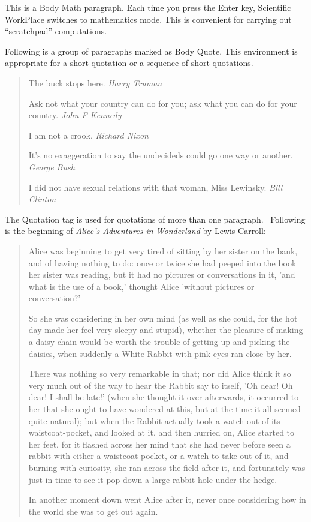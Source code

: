 \documentclass[11pt,spanish]{report}
\begin{document}
This is a Body Math paragraph. Each time you press the Enter key, Scientific
WorkPlace switches to mathematics mode. This is convenient for carrying out
``scratchpad'' computations.

Following is a group of paragraphs marked as Body Quote. This environment is
appropriate for a short quotation or a sequence of short quotations.

\begin{quote}
The buck stops here. \emph{Harry Truman}

Ask not what your country can do for you; ask what you can do for your
country. \emph{John F Kennedy}

I am not a crook. \emph{Richard Nixon}

It's no exaggeration to say the undecideds could go one way or another. 
\emph{George Bush}

I did not have sexual relations with that woman, Miss Lewinsky. \emph{Bill
Clinton}
\end{quote}

The Quotation tag is used for quotations of more than one paragraph. \
Following is the beginning of \emph{Alice's Adventures in Wonderland }by
Lewis Carroll:

\begin{quotation}
Alice was beginning to get very tired of sitting by her sister on the bank,
and of having nothing to do: once or twice she had peeped into the book her
sister was reading, but it had no pictures or conversations in it, 'and what
is the use of a book,' thought Alice 'without pictures or conversation?'

So she was considering in her own mind (as well as she could, for the hot
day made her feel very sleepy and stupid), whether the pleasure of making a
daisy-chain would be worth the trouble of getting up and picking the
daisies, when suddenly a White Rabbit with pink eyes ran close by her.

There was nothing so very remarkable in that; nor did Alice think it so very
much out of the way to hear the Rabbit say to itself, 'Oh dear! Oh dear! I
shall be late!' (when she thought it over afterwards, it occurred to her
that she ought to have wondered at this, but at the time it all seemed quite
natural); but when the Rabbit actually took a watch out of its
waistcoat-pocket, and looked at it, and then hurried on, Alice started to
her feet, for it flashed across her mind that she had never before seen a
rabbit with either a waistcoat-pocket, or a watch to take out of it, and
burning with curiosity, she ran across the field after it, and fortunately
was just in time to see it pop down a large rabbit-hole under the hedge.

In another moment down went Alice after it, never once considering how in
the world she was to get out again.
\end{quotation}
\end{document}
